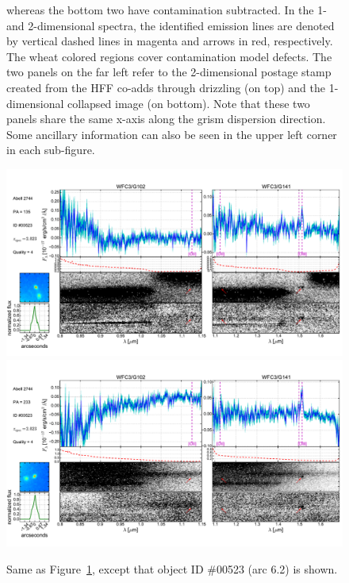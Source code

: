 \begin{figure}
{    whereas the bottom two have contamination subtracted. In the 1- and 2-dimensional spectra, the identified
    emission lines are denoted by vertical dashed lines in magenta and arrows in red, respectively. The wheat
    colored regions cover contamination model defects. The two panels on the far left refer to the 2-dimensional
    postage stamp created from the HFF co-adds through drizzling (on top) and the 1-dimensional collapsed image
    (on bottom). Note that these two panels share the same x-axis along the grism dispersion direction. Some
    ancillary information can also be seen in the upper left corner in each sub-figure.\label{fig:ELarc6.1}}
\end{figure}

\begin{figure}
    \centering
    \includegraphics[width=\textwidth]{fig/clA2744_id523_pa135_zsQ4.pdf}\\
    \includegraphics[width=\textwidth]{fig/clA2744_id523_pa233_zsQ4.pdf}
    \caption{Same as Figure~\ref{fig:ELarc6.1}, except that object ID \#00523 (arc 6.2) is shown.}
    \label{fig:ELarc6.2}
\end{figure}

